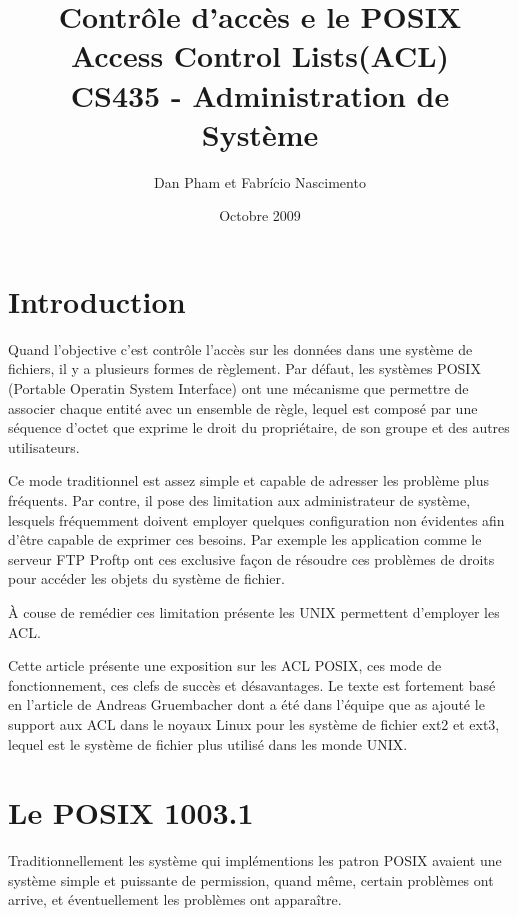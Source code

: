 \documentclass[draft]{article}
\title{\textbf{Contrôle d'accès e le POSIX Access Control Lists(ACL)} \\ CS435 - Administration de Système }
\author{Dan Pham et Fabrício Nascimento}
\date{Octobre 2009}
\begin{document}
\maketitle
\newpage
\section*{Introduction}

Quand l'objective c'est contrôle l'accès sur les données dans une système de fichiers, il y a plusieurs formes de règlement. Par défaut, les systèmes POSIX (Portable Operatin System Interface)\cite{ieee1,ieee2} ont une mécanisme que permettre de associer chaque entité avec un ensemble de règle, lequel est composé par une séquence d'octet que exprime le droit du propriétaire, de son groupe et des autres utilisateurs. 

Ce mode traditionnel est assez simple et capable de adresser les problème plus fréquents. Par contre, il pose des limitation aux administrateur de système, lesquels fréquemment doivent employer quelques configuration non évidentes afin d'être capable de exprimer ces besoins. Par exemple les application comme le serveur FTP Proftp\cite{ftp} ont ces exclusive façon de résoudre ces problèmes de droits pour accéder les objets du système de fichier.

À couse de remédier ces limitation présente les UNIX permettent d'employer les ACL.   

Cette article présente une exposition sur les ACL POSIX, ces mode de fonctionnement, ces clefs de succès et désavantages. Le texte est fortement basé en l'article de Andreas Gruembacher\cite{aclsuse} dont a été dans l'équipe que as ajouté le support aux ACL dans le noyaux Linux pour les système de fichier ext2 et ext3, lequel est le système de fichier plus utilisé dans les monde UNIX.


\section*{Le POSIX 1003.1}


Traditionnellement les système qui implémentions les patron POSIX avaient une système simple et puissante de permission, quand même, certain problèmes ont arrive, et éventuellement les problèmes ont apparaître. 
\end{document}

